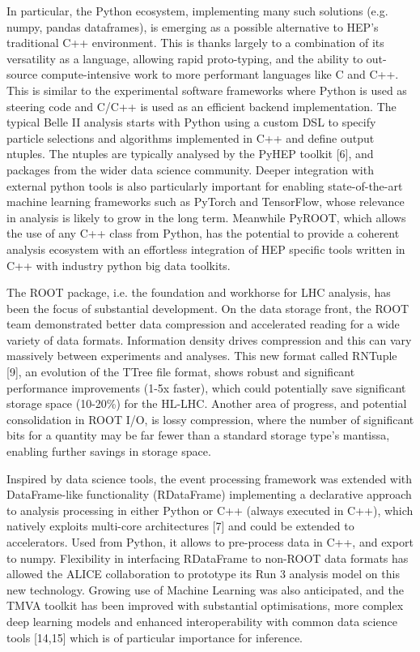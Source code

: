 \documentclass[10pt,a4paper]{article}
\begin{document}
In particular, the Python ecosystem, implementing many such solutions
(e.g. numpy, pandas dataframes), is emerging as a possible alternative
to HEP's traditional C++ environment. This is thanks largely to a
combination of its versatility as a language, allowing rapid
proto-typing, and the ability to out-source compute-intensive work to
more performant languages like C and C++. This is similar to the
experimental software frameworks where Python is used as steering code
and C/C++ is used as an efficient backend implementation. The typical
Belle II analysis starts with Python using a custom DSL to specify
particle selections and algorithms implemented in C++ and define output
ntuples. The ntuples are typically analysed by the PyHEP toolkit
{[}6{]}, and packages from the wider data science community. Deeper
integration with external python tools is also particularly important
for enabling state-of-the-art machine learning frameworks such as
PyTorch and TensorFlow, whose relevance in analysis is likely to grow in
the long term. Meanwhile PyROOT, which allows the use of any C++ class
from Python, has the potential to provide a coherent analysis ecosystem
with an effortless integration of HEP specific tools written in C++ with
industry python big data toolkits.

The ROOT package, i.e. the foundation and workhorse for LHC analysis,
has been the focus of substantial development. On the data storage
front, the ROOT team demonstrated better data compression and
accelerated reading for a wide variety of data formats. Information
density drives compression and this can vary massively between
experiments and analyses. This new format called RNTuple {[}9{]}, an
evolution of the TTree file format, shows robust and significant
performance improvements (1-5x faster), which could potentially save
significant storage space (10-20\%) for the HL-LHC. Another area of
progress, and potential consolidation in ROOT I/O, is lossy compression,
where the number of significant bits for a quantity may be far fewer
than a standard storage type's mantissa, enabling further savings in
storage space.

Inspired by data science tools, the event processing framework was
extended with DataFrame-like functionality (RDataFrame) implementing a
declarative approach to analysis processing in either Python or C++
(always executed in C++), which natively exploits multi-core
architectures {[}7{]} and could be extended to accelerators. Used from
Python, it allows to pre-process data in C++, and export to numpy.
Flexibility in interfacing RDataFrame to non-ROOT data formats has
allowed the ALICE collaboration to prototype its Run 3 analysis model on
this new technology. Growing use of Machine Learning was also
anticipated, and the TMVA toolkit has been improved with substantial
optimisations, more complex deep learning models and enhanced
interoperability with common data science tools {[}14,15{]} which is of
particular importance for inference.
\end{document}
